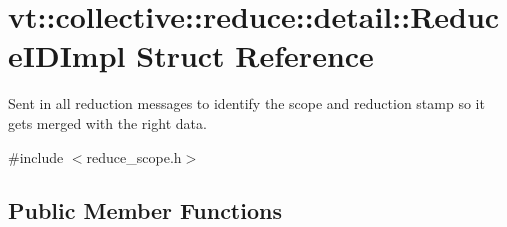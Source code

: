 \hypertarget{structvt_1_1collective_1_1reduce_1_1detail_1_1_reduce_i_d_impl}{}\section{vt\+:\+:collective\+:\+:reduce\+:\+:detail\+:\+:Reduce\+I\+D\+Impl Struct Reference}
\label{structvt_1_1collective_1_1reduce_1_1detail_1_1_reduce_i_d_impl}


Sent in all reduction messages to identify the scope and reduction stamp so it gets merged with the right data.  




{\ttfamily \#include $<$reduce\+\_\+scope.\+h$>$}

\subsection*{Public Member Functions}
